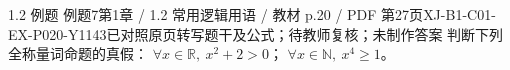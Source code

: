\par\noindent\begin{minipage}{\linewidth}
\begin{bankitem}{1.2 例题 例题7}{第1章 / 1.2 常用逻辑用语 / 教材 p.20 / PDF 第27页}{XJ-B1-C01-EX-P020-Y1143}{已对照原页转写题干及公式；待教师复核；未制作答案}
判断下列全称量词命题的真假：
$\forall x\in\mathbb R,\ x^2+2>0$；
$\forall x\in\mathbb N,\ x^4\ge1$。
\end{bankitem}
\end{minipage}\par\medskip
